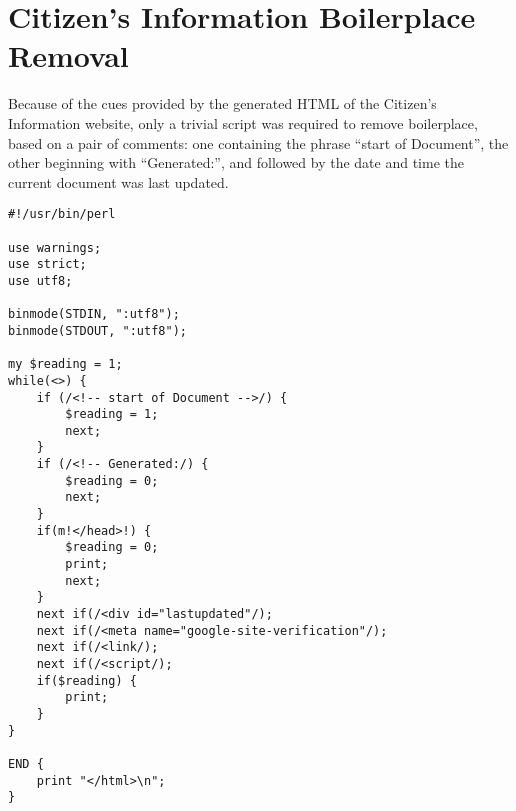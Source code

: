 \chapter{Citizen's Information Boilerplace Removal}
\label{app:bpremoval}

Because of the cues provided by the generated HTML of the Citizen's Information website, only a trivial
script was required to remove boilerplace, based on a pair of comments: one containing the phrase
``start of Document'', the other beginning with ``Generated:'', and followed by the date and time the
current document was last updated.

\begin{verbatim}
#!/usr/bin/perl

use warnings;
use strict;
use utf8;

binmode(STDIN, ":utf8");
binmode(STDOUT, ":utf8");

my $reading = 1;
while(<>) {
    if (/<!-- start of Document -->/) {
        $reading = 1;
        next;
    }
    if (/<!-- Generated:/) {
        $reading = 0;
        next;
    }
    if(m!</head>!) {
        $reading = 0;
        print;
        next;
    }
    next if(/<div id="lastupdated"/);
    next if(/<meta name="google-site-verification"/);
    next if(/<link/);
    next if(/<script/);
    if($reading) {
        print;
    }
}

END {
    print "</html>\n";
}
\end{verbatim}


